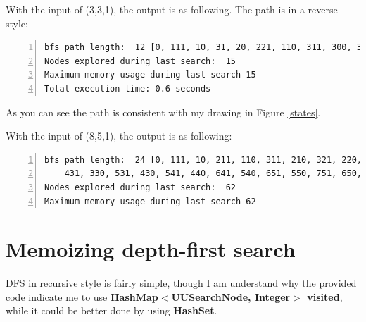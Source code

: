\documentclass{article}
\begin{document}
With the input of (3,3,1), the output is as following. The path is in a reverse style:

\begin{lstlisting}[numbers=left]
bfs path length:  12 [0, 111, 10, 31, 20, 221, 110, 311, 300, 321, 220, 331]
Nodes explored during last search:  15
Maximum memory usage during last search 15
Total execution time: 0.6 seconds
\end{lstlisting}

As you can see the path is consistent with my drawing in Figure \ref{states}.

With the input of (8,5,1), the output is as following:

\begin{lstlisting}[numbers=left]
bfs path length:  24 [0, 111, 10, 211, 110, 311, 210, 321, 220, 421, 320,
	431, 330, 531, 430, 541, 440, 641, 540, 651, 550, 751, 650, 851]
Nodes explored during last search:  62
Maximum memory usage during last search 62
\end{lstlisting}













\section{Memoizing depth-first search}

DFS in recursive style is fairly simple, though I am understand why the provided code indicate me to use \textbf{HashMap$<$UUSearchNode, Integer$>$ visited}, while it could be better done by using \textbf{HashSet}. 
\end{document}
